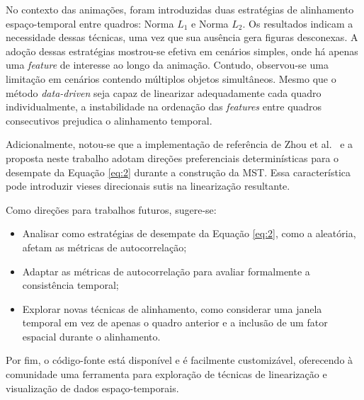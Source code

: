 \documentclass[12pt]{article}
\begin{document}
No contexto das animações, foram introduzidas duas estratégias de alinhamento espaço-temporal entre quadros:
Norma $L_1$ e Norma $L_2$. Os resultados indicam a necessidade dessas técnicas, uma vez que sua
ausência gera figuras desconexas. A adoção dessas estratégias mostrou-se efetiva em cenários simples, onde
há apenas uma \textit{feature} de interesse ao longo da animação. Contudo, observou-se uma limitação
em cenários contendo múltiplos objetos simultâneos. Mesmo que o método \textit{data-driven} seja capaz de
linearizar adequadamente cada quadro individualmente, a instabilidade na ordenação das
\textit{features} entre quadros consecutivos prejudica o alinhamento temporal.

Adicionalmente, notou-se que a implementação de referência de Zhou et al.~\cite{zhou:20} e a proposta neste
trabalho adotam direções preferenciais determinísticas para o desempate da Equação \ref{eq:2} durante a
construção da MST. Essa característica pode introduzir vieses direcionais sutis na linearização resultante.

Como direções para trabalhos futuros, sugere-se:

\begin{itemize}
    \item Analisar como estratégias de desempate da Equação \ref{eq:2}, como a aleatória, afetam as métricas de autocorrelação;
    \item Adaptar as métricas de autocorrelação para avaliar formalmente a consistência temporal;
    \item Explorar novas técnicas de alinhamento, como considerar uma janela temporal em vez de apenas o quadro anterior e a inclusão de um fator espacial durante o alinhamento.
\end{itemize}

Por fim, o código-fonte está disponível e é facilmente customizável, oferecendo à comunidade uma
ferramenta para exploração de técnicas de linearização e visualização de dados espaço-temporais.

\printbibliography
% 
% 
\end{document}
